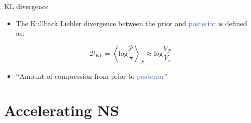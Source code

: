 \documentclass[aspectratio=169, 11pt]{beamer}
\begin{document}
\begin{frame}{KL divergence}
\vspace{3em}
\begin{itemize}
    \item The Kullback Liebler divergence between the \textcolor{BurntOrange}{prior} and \textcolor{RoyalBlue}{posterior} is defined as:
\end{itemize}

\begin{equation}
    \mathcal{D}_\text{KL} = \left\langle \text{log} \frac{\mathcal{P}}{\pi} \right\rangle_\mathcal{P} \approx \text{log}\frac{V_\mathcal{P}}{V_\pi}
\end{equation}

\begin{itemize}
    \item ``Amount of compression from \textcolor{BurntOrange}{prior} to \textcolor{RoyalBlue}{posterior}''
\end{itemize}%
\begin{minipage}{0.8\textwidth}\vspace{21em}
\end{minipage}

\end{frame}


\section{Accelerating NS}
\end{document}
